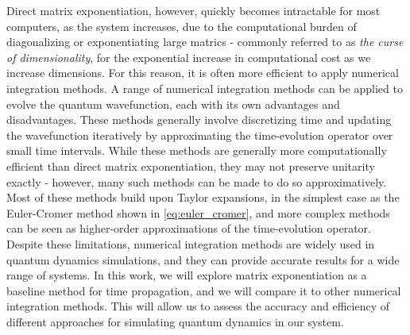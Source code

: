 \documentclass{subfiles}
\begin{document}
Direct matrix exponentiation, however, quickly becomes intractable for most computers, as the system increases, due to the computational burden of diagonalizing or exponentiating large matrics - commonly referred to as \emph{the curse of dimensionality}, for the exponential increase in computational cost as we increase dimensions. For this reason, it is often more efficient to apply numerical integration methods. A range of numerical integration methods can be applied to evolve the quantum wavefunction, each with its own advantages and disadvantages. These methods generally involve discretizing time and updating the wavefunction iteratively by approximating the time-evolution operator over small time intervals. While these methods are generally more computationally efficient than direct matrix exponentiation, they may not preserve unitarity exactly - however, many such methods can be made to do so approximatively. Most of these methods build upon Taylor expansions, in the simplest case as the Euler-Cromer method shown in \eqref{eq:euler_cromer}, and more complex methods can be seen as higher-order approximations of the time-evolution operator. 
\\

Despite these limitations, numerical integration methods are widely used in quantum dynamics simulations, and they can provide accurate results for a wide range of systems. In this work, we will explore matrix exponentiation as a baseline method for time propagation, and we will compare it to other numerical integration methods. This will allow us to assess the accuracy and efficiency of different approaches for simulating quantum dynamics in our system. 
\\
\end{document}
